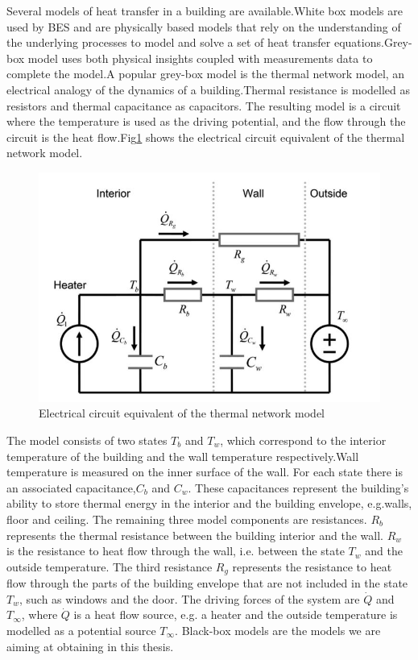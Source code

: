 \documentclass[a4paper,12pt]{article}
\numberwithin{equation}{section}
\begin{document}
Several models of heat transfer in a building are available.White box models are used by BES and are physically based models that rely on the understanding of the underlying processes to model and solve a set of heat transfer equations.Grey-box model uses both physical insights coupled with measurements data to complete the model.A popular grey-box model is the thermal network model, an electrical analogy of the dynamics of a building.Thermal resistance is modelled as resistors and
thermal capacitance as capacitors. The resulting model is a circuit where the temperature is used as the driving potential, and the flow through the circuit is the heat    flow.Fig\ref{fig:thermalmodel} shows the electrical circuit equivalent  of the thermal network model.


\begin{figure}[H]
    \includegraphics[scale=0.5]{thermal.JPG}
    \centering
    \caption{Electrical circuit equivalent  of the thermal network model}
    \label{fig:thermalmodel}
\end{figure}

\noindent
The model consists of two states $T_{b}$ and $T_{w}$, which correspond to the interior temperature of the building and the wall temperature respectively.Wall temperature is measured on the inner surface of the wall. For each state there is an associated capacitance,$C_{b}$ and $C_{w}$. These capacitances represent the building’s ability to store thermal energy in the interior and the building envelope, e.g.walls, floor and ceiling. The remaining three model components are resistances. $R_{b}$ represents the thermal resistance between the building interior and the wall. $R_{w}$ is the resistance to heat flow through the wall, i.e. between the state $T_{w}$ and the outside temperature. The third resistance $R_{g}$ represents the resistance to heat flow through the parts of the building envelope that are not included in the state $T_{w}$, such as windows and the door. The driving forces of the system are $\dot{Q}$ and $T_{\infty}$, where $\dot{Q}$ is a heat flow source, e.g. a heater and the outside temperature is modelled as a potential source $T_{\infty}$. Black-box models are the models we are aiming at obtaining in this thesis.
\end{document}
